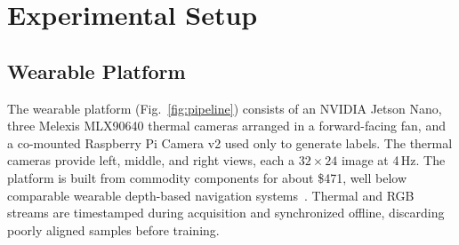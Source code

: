 \section{Experimental Setup}




\subsection{Wearable Platform}
\label{subsec:platform}
The wearable platform (Fig.~\ref{fig:pipeline}) consists of an NVIDIA Jetson
Nano, three Melexis MLX90640 thermal cameras arranged in a forward-facing fan,
and a co-mounted Raspberry Pi Camera v2 used only to generate labels. The
thermal cameras provide left, middle, and right views, each a $32\times24$
image at 4\,Hz. The platform is built from commodity components for about
\$471, well below comparable wearable depth-based navigation
systems~\cite{li2025rgbd,bai2019wearable}. Thermal and RGB streams are
timestamped during acquisition and synchronized offline, discarding poorly
aligned samples before training.


